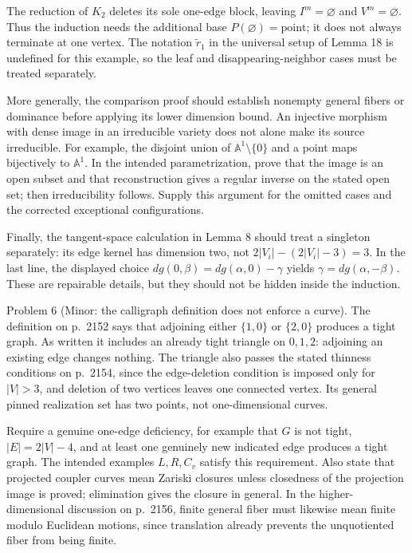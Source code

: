 \documentclass[10pt]{article}
\begin{document}
The reduction of \(K_2\) deletes its sole one-edge block, leaving \(I^m=\varnothing\) and \(V^m=\varnothing\). Thus the induction needs the additional base \(P(\varnothing)=\mathrm{point}\); it does not always terminate at one vertex. The notation \(\widetilde r_1\) in the universal setup of Lemma 18 is undefined for this example, so the leaf and disappearing-neighbor cases must be treated separately.\par
More generally, the comparison proof should establish nonempty general fibers or dominance before applying its lower dimension bound. An injective morphism with dense image in an irreducible variety does not alone make its source irreducible. For example, the disjoint union of \(\mathbb A^1\setminus\{0\}\) and a point maps bijectively to \(\mathbb A^1\). In the intended parametrization, prove that the image is an open subset and that reconstruction gives a regular inverse on the stated open set; then irreducibility follows. Supply this argument for the omitted cases and the corrected exceptional configurations.\par
Finally, the tangent-space calculation in Lemma 8 should treat a singleton separately: its edge kernel has dimension two, not \(2|V_i|-(2|V_i|-3)=3\). In the last line, the displayed choice \(dg(0,\beta)=dg(\alpha,0)-\gamma\) yields \(\gamma=dg(\alpha,-\beta)\). These are repairable details, but they should not be hidden inside the induction.\par
Problem 6 (Minor: the calligraph definition does not enforce a curve).  The definition on p. 2152 says that adjoining either \(\{1,0\}\) or \(\{2,0\}\) produces a tight graph. As written it includes an already tight triangle on \(0,1,2\): adjoining an existing edge changes nothing. The triangle also passes the stated thinness conditions on p. 2154, since the edge-deletion condition is imposed only for \(|V|>3\), and deletion of two vertices leaves one connected vertex. Its general pinned realization set has two points, not one-dimensional curves.\par
Require a genuine one-edge deficiency, for example that \(G\) is not tight, \(|E|=2|V|-4\), and at least one genuinely new indicated edge produces a tight graph. The intended examples \(L,R,C_v\) satisfy this requirement. Also state that projected coupler curves mean Zariski closures unless closedness of the projection image is proved; elimination gives the closure in general. In the higher-dimensional discussion on p. 2156, finite general fiber must likewise mean finite modulo Euclidean motions, since translation already prevents the unquotiented fiber from being finite.\par
\end{document}
